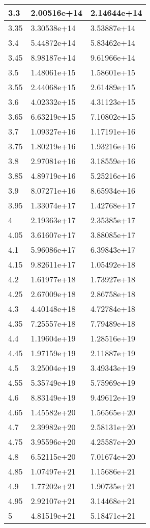 \documentclass[a4paper,14pt]{extarticle}
\begin{document}
\begin{longtable}{|m{3cm}|m{3cm}|m{3cm}|}
\hline
3.3 & 2.00516e+14 & 2.14644e+14\\
\hline
3.35 & 3.30538e+14 & 3.53887e+14\\
\hline
3.4 & 5.44872e+14 & 5.83462e+14\\
\hline
3.45 & 8.98187e+14 & 9.61966e+14\\
\hline
3.5 & 1.48061e+15 & 1.58601e+15\\
\hline
3.55 & 2.44068e+15 & 2.61489e+15\\
\hline
3.6 & 4.02332e+15 & 4.31123e+15\\
\hline
3.65 & 6.63219e+15 & 7.10802e+15\\
\hline
3.7 & 1.09327e+16 & 1.17191e+16\\
\hline
3.75 & 1.80219e+16 & 1.93216e+16\\
\hline
3.8 & 2.97081e+16 & 3.18559e+16\\
\hline
3.85 & 4.89719e+16 & 5.25216e+16\\
\hline
3.9 & 8.07271e+16 & 8.65934e+16\\
\hline
3.95 & 1.33074e+17 & 1.42768e+17\\
\hline
4 & 2.19363e+17 & 2.35385e+17\\
\hline
4.05 & 3.61607e+17 & 3.88085e+17\\
\hline
4.1 & 5.96086e+17 & 6.39843e+17\\
\hline
4.15 & 9.82611e+17 & 1.05492e+18\\
\hline
4.2 & 1.61977e+18 & 1.73927e+18\\
\hline
4.25 & 2.67009e+18 & 2.86758e+18\\
\hline
4.3 & 4.40148e+18 & 4.72784e+18\\
\hline
4.35 & 7.25557e+18 & 7.79489e+18\\
\hline
4.4 & 1.19604e+19 & 1.28516e+19\\
\hline
4.45 & 1.97159e+19 & 2.11887e+19\\
\hline
4.5 & 3.25004e+19 & 3.49343e+19\\
\hline
4.55 & 5.35749e+19 & 5.75969e+19\\
\hline
4.6 & 8.83149e+19 & 9.49612e+19\\
\hline
4.65 & 1.45582e+20 & 1.56565e+20\\
\hline
4.7 & 2.39982e+20 & 2.58131e+20\\
\hline
4.75 & 3.95596e+20 & 4.25587e+20\\
\hline
4.8 & 6.52115e+20 & 7.01674e+20\\
\hline
4.85 & 1.07497e+21 & 1.15686e+21\\
\hline
4.9 & 1.77202e+21 & 1.90735e+21\\
\hline
4.95 & 2.92107e+21 & 3.14468e+21\\
\hline
5 & 4.81519e+21 & 5.18471e+21\\
\hline
\end{longtable}
\end{document}
